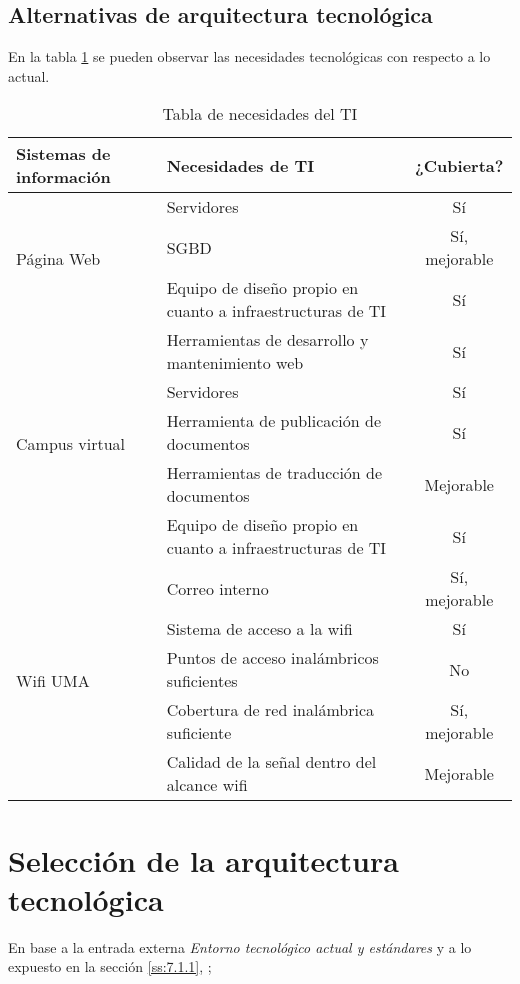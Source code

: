 \documentclass[11pt,a4paper,spanish,twoside]{book}
\begin{document}
\subsection{Alternativas de arquitectura tecnológica} \label{ss:7.1.1}
En la tabla \ref{Tab:TabNec} se pueden observar las necesidades 
tecnológicas con respecto a lo actual.
\begin{table}[!h]
\centering
  \begin{tabular}{p{2.7cm}|p{5cm}|c}
    \textbf{Sistemas de información} & \textbf{Necesidades de TI} &
    \textbf{¿Cubierta?} \\
    \hline \hline
    \multirow{3}{4cm}{Página Web}
    & Servidores & Sí \\ \cline{2-3}
    & SGBD & Sí, mejorable \\ \cline{2-3}
    & Equipo de diseño propio en cuanto a infraestructuras de TI & Sí\\ 
    \cline{2-3}
    & Herramientas de desarrollo y mantenimiento web & Sí\\ \hline
    
    \multirow{3}{4cm}{Campus virtual}
    & Servidores & Sí\\ \cline{2-3}
    & Herramienta de publicación de documentos & Sí\\ \cline{2-3}
    & Herramientas de traducción de documentos & Mejorable\\ \cline{2-3}
    & Equipo de diseño propio en cuanto a infraestructuras de TI & Sí\\
    \cline{2-3}
    & Correo interno & Sí, mejorable\\ \hline
    
    \multirow{3}{4cm}{Wifi UMA}
    & Sistema de acceso a la wifi & Sí\\ \cline{2-3}
    & Puntos de acceso inalámbricos suficientes & No\\ \cline{2-3}
    & Cobertura de red inalámbrica suficiente & Sí, mejorable\\ \cline{2-3}
    & Calidad de la señal dentro del alcance wifi & Mejorable\\ \hline
    
  \end{tabular}
  \caption{Tabla de necesidades del TI} \label{Tab:TabNec}
\end{table}

\section{Selección de la arquitectura tecnológica}
En base a la entrada externa \emph{Entorno tecnológico actual y estándares} y
a lo expuesto 
en la sección \vref{ss:7.1.1}, \emph{}; 
\end{document}
